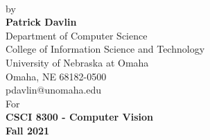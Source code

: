 \begin{center}
\begin{singlespace}
 \vspace*{2in}
  \LARGE
  \textbf{\assignmentTitle{}}
  \normalsize
  \\[0.3in]
  by
  \\[0.3in]
  \textbf{Patrick Davlin}\\
  Department of Computer Science\\
  College of Information Science and Technology\\
  University of Nebraska at Omaha\\
  Omaha, NE 68182-0500\\
  pdavlin@unomaha.edu
  \\[0.3in]
  For
  \\[0.3in]
  \textbf{CSCI 8300 - Computer Vision}
  \\[0.75in]
  \textbf{Fall 2021}
  \newpage
\end{singlespace}
\end{center}